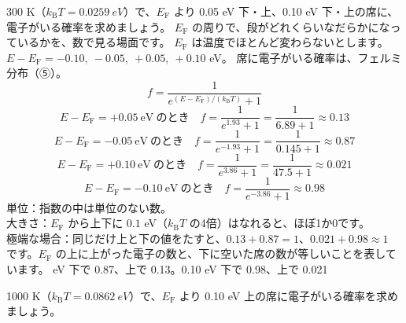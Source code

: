 \label{ph:原-8:ex5}
\begin{phreidai}
300 K（$k_{\mathrm B}T=\qty{0.0259}{eV}$）で、$E_{\mathrm F}$ より 0.05 eV 下・上、0.10 eV 下・上の席に、電子がいる確率を求めましょう。
\phbamen
$E_{\mathrm F}$ の周りで、段がどれくらいなだらかになっているかを、数で見る場面です。
\phmushi
$E_{\mathrm F}$ は温度でほとんど変わらないとします。
\phzu
$E-E_{\mathrm F}=-0.10,\ -0.05,\ +0.05,\ +0.10$ eV。
\phriyu
席に電子がいる確率は、フェルミ分布（⑤）。
\phtateru
\[ f=\frac{1}{e^{(E-E_{\mathrm F})/(k_{\mathrm B}T)}+1} \]
\phtoku
\[ E-E_{\mathrm F}=+0.05\ \text{eV}\ \text{のとき}\quad f=\frac{1}{e^{1.93}+1}=\frac{1}{6.89+1}\approx0.13 \]
\[ E-E_{\mathrm F}=-0.05\ \text{eV}\ \text{のとき}\quad f=\frac{1}{e^{-1.93}+1}=\frac{1}{0.145+1}\approx0.87 \]
\[ E-E_{\mathrm F}=+0.10\ \text{eV}\ \text{のとき}\quad f=\frac{1}{e^{3.86}+1}=\frac{1}{47.5+1}\approx0.021 \]
\[ E-E_{\mathrm F}=-0.10\ \text{eV}\ \text{のとき}\quad f=\frac{1}{e^{-3.86}+1}\approx0.98 \]
\phtashikame
単位：指数の中は単位のない数。\\
大きさ：$E_{\mathrm F}$ から上下に $0.1$ eV（$k_{\mathrm B}T$ の4倍）はなれると、ほぼ1か0です。\\
極端な場合：同じだけ上と下の値をたすと、$0.13+0.87=1$、$0.021+0.98\approx1$ です。$E_{\mathrm F}$ の上に上がった電子の数と、下に空いた席の数が等しいことを表しています。
 eV 下で 0.87、上で 0.13。0.10 eV 下で 0.98、上で 0.021
\end{phreidai}
\begin{jibun}
1000 K（$k_{\mathrm B}T=\qty{0.0862}{eV}$）で、$E_{\mathrm F}$ より 0.10 eV 上の席に電子がいる確率を求めましょう。
\end{jibun}

